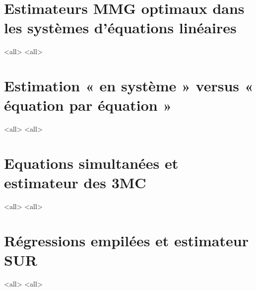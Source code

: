 \section{Estimateurs MMG optimaux dans les systèmes d’équations linéaires}
\frame{\sectionpage}
\mode<all>
\mode<all>{\usebackgroundtemplate{}}
\section{Estimation « en système » versus « équation par équation »}
\frame{\sectionpage}
\mode<all>
\mode<all>{\usebackgroundtemplate{}}
\section{Equations simultanées et estimateur des 3MC}
\frame{\sectionpage}
\mode<all>
\mode<all>{\usebackgroundtemplate{}}
\section{Régressions empilées et estimateur SUR}
\frame{\sectionpage}
\mode<all>
\mode<all>{\usebackgroundtemplate{}}




%
%

